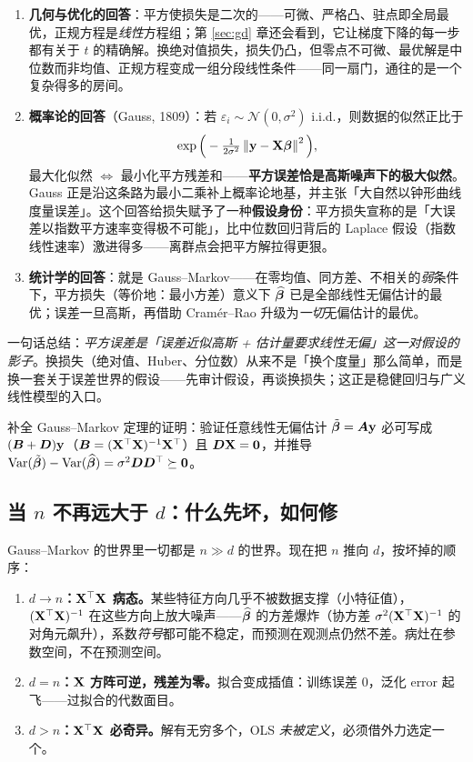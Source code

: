 \begin{enumerate}[label=(\arabic*)]
  \item \textbf{几何与优化的回答}：平方使损失是二次的——可微、严格凸、驻点即全局最优，正规方程是\textit{线性}方程组；第 \ref{sec:gd} 章还会看到，它让梯度下降的每一步都有关于 $t$ 的精确解。换绝对值损失，损失仍凸，但零点不可微、最优解是中位数而非均值、正规方程变成一组分段线性条件——同一扇门，通往的是一个复杂得多的房间。
  \item \textbf{概率论的回答}（Gauss, 1809）：若 $\varepsilon_i \sim \mathcal{N}(0, \sigma^2)$ i.i.d.，则数据的似然正比于
  \[
    \exp\Big( -\tfrac{1}{2\sigma^2} \left\lVert \mathbf{y} - \mathbf{X}\bm{\beta} \right\rVert^2 \Big),
  \]
  最大化似然 $\Longleftrightarrow$ 最小化平方残差和——\textbf{平方误差恰是高斯噪声下的极大似然}\cite{gauss1809}。Gauss 正是沿这条路为最小二乘补上概率论地基，并主张「大自然以钟形曲线度量误差」。这个回答给损失赋予了一种\textbf{假设身份}：平方损失宣称的是「大误差以指数平方速率变得极不可能」，比中位数回归背后的 Laplace 假设（指数线性速率）激进得多——离群点会把平方解拉得更狠。
  \item \textbf{统计学的回答}：就是 Gauss--Markov——在零均值、同方差、不相关的\textit{弱}条件下，平方损失（等价地：最小方差）意义下 $\widehat{\bm{\beta}}$ 已是全部线性无偏估计的最优；误差一旦高斯，再借助 Cram\'er--Rao 升级为\textit{一切}无偏估计的最优。
\end{enumerate}

一句话总结：\textit{平方误差是「误差近似高斯 + 估计量要求线性无偏」这一对假设的影子}。换损失（绝对值、Huber、分位数）从来不是「换个度量」那么简单，而是换一套关于误差世界的假设——先审计假设，再谈换损失；这正是稳健回归与广义线性模型的入口。

\begin{exercise}\label{ex:gm}
补全 Gauss--Markov 定理的证明：验证任意线性无偏估计 $\tilde{\bm{\beta}} = \bm{A}\mathbf{y}$ 必可写成 $(\bm{B} + \bm{D})\mathbf{y}$（$\bm{B} = (\mathbf{X}^\top\mathbf{X})^{-1}\mathbf{X}^\top$）且 $\bm{D}\mathbf{X} = \mathbf{0}$，并推导 $\mathrm{Var}(\tilde{\bm{\beta}}) - \mathrm{Var}(\widehat{\bm{\beta}}) = \sigma^2 \bm{D}\bm{D}^\top \succeq \mathbf{0}$。
\end{exercise}

\subsection{当 $n$ 不再远大于 $d$：什么先坏，如何修}\label{sec:hd-break}

Gauss--Markov 的世界里一切都是 $n \gg d$ 的世界。现在把 $n$ 推向 $d$，按坏掉的顺序：

\begin{enumerate}[label=(\arabic*)]
  \item \textbf{$d \to n$：$\mathbf{X}^\top\mathbf{X}$ 病态。}某些特征方向几乎不被数据支撑（小特征值），$(\mathbf{X}^\top\mathbf{X})^{-1}$ 在这些方向上放大噪声——$\widehat{\bm{\beta}}$ 的方差爆炸（协方差 $\sigma^2(\mathbf{X}^\top\mathbf{X})^{-1}$ 的对角元飙升），系数\textit{符号}都可能不稳定，而预测在观测点仍然不差。病灶在参数空间，不在预测空间。
  \item \textbf{$d = n$：$\mathbf{X}$ 方阵可逆，残差为零。}拟合变成插值：训练误差 $0$，泛化 error 起飞——过拟合的代数面目。
  \item \textbf{$d > n$：$\mathbf{X}^\top\mathbf{X}$ 必奇异。}解有无穷多个，OLS \textit{未被定义}，必须借外力选定一个。
\end{enumerate}

